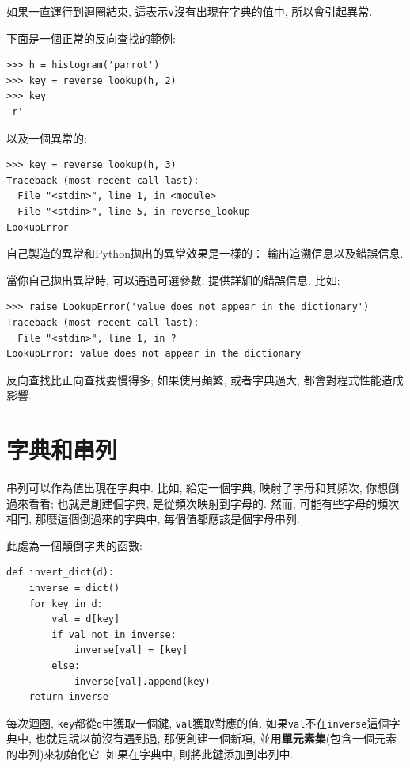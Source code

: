 \documentclass[10pt]{book}
\begin{document}
如果一直運行到迴圈結束, 這表示{\tt v}沒有出現在字典的值中, 
所以會引起異常. 

下面是一個正常的反向查找的範例:

\begin{verbatim}
>>> h = histogram('parrot')
>>> key = reverse_lookup(h, 2)
>>> key
'r'
\end{verbatim}
%
以及一個異常的:

\begin{verbatim}
>>> key = reverse_lookup(h, 3)
Traceback (most recent call last):
  File "<stdin>", line 1, in <module>
  File "<stdin>", line 5, in reverse_lookup
LookupError
\end{verbatim}
%
自己製造的異常和Python拋出的異常效果是一樣的：
輸出追溯信息以及錯誤信息. 

當你自己拋出異常時, 可以通過可選參數, 提供詳細的錯誤信息. 比如:

\begin{verbatim}
>>> raise LookupError('value does not appear in the dictionary')
Traceback (most recent call last):
  File "<stdin>", line 1, in ?
LookupError: value does not appear in the dictionary
\end{verbatim}
%
反向查找比正向查找要慢得多;
如果使用頻繁, 或者字典過大, 都會對程式性能造成影響. 


\section{字典和串列}
\label{invert}

串列可以作為值出現在字典中. 比如, 給定一個字典, 映射了字母和其頻次, 
你想倒過來看看; 也就是創建個字典, 是從頻次映射到字母的. 
然而, 可能有些字母的頻次相同, 那麼這個倒過來的字典中, 每個值都應該是個字母串列. 

此處為一個顛倒字典的函數:

\begin{verbatim}
def invert_dict(d):
    inverse = dict()
    for key in d:
        val = d[key]
        if val not in inverse:
            inverse[val] = [key]
        else:
            inverse[val].append(key)
    return inverse
\end{verbatim}
%
每次迴圈, {\tt key}都從{\tt d}中獲取一個鍵, {\tt val}獲取對應的值. 
如果{\tt val}不在{\tt inverse}這個字典中, 也就是說以前沒有遇到過, 
那便創建一個新項, 並用{\bf 單元素集}(包含一個元素的串列)來初始化它. 
如果在字典中, 則將此鍵添加到串列中. 
\end{document}
